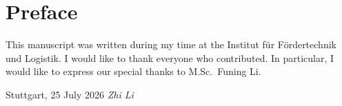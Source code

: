 \chapter*{Preface}
This manuscript was written during my time at the Institut für Fördertechnik und Logistik. I would like to thank everyone who contributed. In particular, I would like to express our special thanks to M.Sc.~Funing Li.


\vspace{1cm}

\noindent Stuttgart, 25 July 2026 \hfill \textit{Zhi Li}

